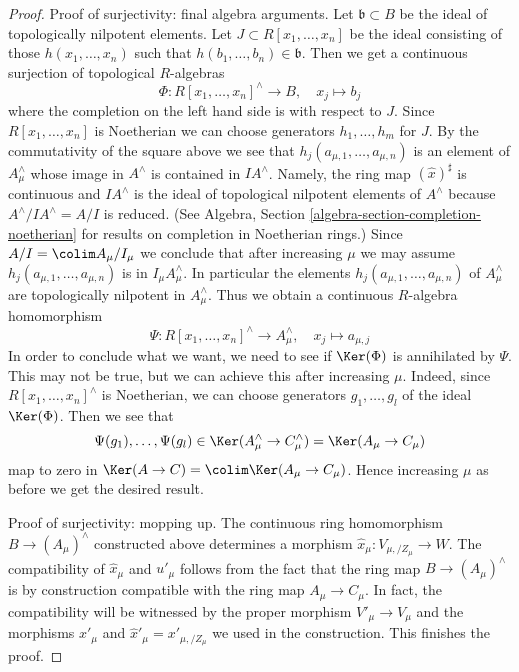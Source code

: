 \begin{proof}
\medskip\noindent
Proof of surjectivity: final algebra arguments.
Let $\mathfrak b \subset B$ be the ideal of topologically nilpotent
elements. Let $J \subset R[x_1, \ldots, x_n]$ be the ideal
consisting of those $h(x_1, \ldots, x_n)$ such that
$h(b_1, \ldots, b_n) \in \mathfrak b$. Then we get a continuous
surjection of topological $R$-algebras
$$
\Phi : R[x_1, \ldots, x_n]^\wedge \longrightarrow B,\quad
x_j \longmapsto b_j
$$
where the completion on the left hand side is with respect to $J$.
Since $R[x_1, \ldots, x_n]$ is Noetherian we can choose
generators $h_1, \ldots, h_m$ for $J$. By the commutativity
of the square above we see that $h_j(a_{\mu, 1}, \ldots, a_{\mu, n})$ is
an element of $A_\mu^\wedge$ whose image in $A^\wedge$ is contained
in $IA^\wedge$. Namely, the ring map $(\hat x)^\sharp$ is continuous
and $IA^\wedge$ is the ideal of topological nilpotent elements
of $A^\wedge$ because $A^\wedge/IA^\wedge = A/I$ is reduced.
(See Algebra, Section \ref{algebra-section-completion-noetherian}
for results on completion in Noetherian rings.)
Since $A/I = \colim A_\mu/I_\mu$ we conclude that after increasing
$\mu$ we may assume $h_j(a_{\mu, 1}, \ldots, a_{\mu, n})$ is in
$I_\mu A_\mu^\wedge$. In particular the elements
$h_j(a_{\mu, 1}, \ldots, a_{\mu, n})$ of $A_\mu^\wedge$
are topologically nilpotent in $A_\mu^\wedge$.
Thus we obtain a continuous $R$-algebra homomorphism
$$
\Psi : R[x_1, \ldots, x_n]^\wedge \longrightarrow A_\mu^\wedge,\quad
x_j \longmapsto a_{\mu, j}
$$
In order to conclude what we want, we need to see if $\Ker(\Phi)$ is
annihilated by $\Psi$. This may not be true, but we can achieve
this after increasing $\mu$. Indeed, since
$R[x_1, \ldots, x_n]^\wedge$ is Noetherian,
we can choose generators $g_1, \ldots, g_l$ of the ideal
$\Ker(\Phi)$. Then we see that
$$
\Psi(g_1), \ldots, \Psi(g_l) \in
\Ker(A_\mu^\wedge \to C_\mu^\wedge) = \Ker(A_\mu \to C_\mu)
$$
map to zero in $\Ker(A \to C) = \colim \Ker(A_\mu \to C_\mu)$.
Hence increasing $\mu$ as before we get the desired result.

\medskip\noindent
Proof of surjectivity: mopping up. The continuous ring homomorphism
$B \to (A_\mu)^\wedge$ constructed above determines a morphism
$\hat x_\mu : V_{\mu, /Z_\mu} \to W$.
The compatibility of $\hat x_\mu$ and $u'_\mu$ follows
from the fact that the ring map $B \to (A_\mu)^\wedge$
is by construction compatible with the ring map $A_\mu \to C_\mu$.
In fact, the compatibility will be witnessed by the proper morphism
$V'_\mu \to V_\mu$ and the morphisms
$x'_\mu$ and $\hat x'_\mu = x'_{\mu, /Z_\mu}$ we used in
the construction. This finishes the proof.
\end{proof}

